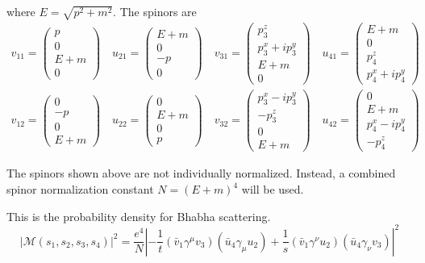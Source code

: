 \documentclass[12pt]{article}
\begin{document}
\noindent
where $E=\sqrt{p^2+m^2}$.
The spinors are
\begin{gather*}
v_{11}=\begin{pmatrix}p\\0\\E+m\\0\end{pmatrix}\quad
u_{21}=\begin{pmatrix}E+m\\0\\-p\\0\end{pmatrix}\quad
v_{31}=\begin{pmatrix}p_3^z\\p_3^x+ip_3^y\\E+m\\0\end{pmatrix}\quad
u_{41}=\begin{pmatrix}E+m\\0\\p_4^z\\p_4^x+ip_4^y\end{pmatrix}
\\
v_{12}=\begin{pmatrix}0\\-p\\0\\E+m\end{pmatrix}\quad
u_{22}=\begin{pmatrix}0\\E+m\\0\\p\end{pmatrix}\quad
v_{32}=\begin{pmatrix}p_3^x-ip_3^y\\-p_3^z\\0\\E+m\end{pmatrix}\quad
u_{42}=\begin{pmatrix}0\\E+m\\p_4^x-ip_4^y\\-p_4^z\end{pmatrix}
\end{gather*}

\noindent
The spinors shown above are not individually normalized.
Instead, a combined spinor normalization constant $N=(E+m)^4$
will be used.

\bigskip
\noindent
This is the probability density for Bhabha scattering.
$$
|\mathcal{M}(s_1,s_2,s_3,s_4)|^2=\frac{e^4}{N}
\left|
-\frac{1}{t}(\bar{v}_1\gamma^\mu v_3)(\bar{u}_4\gamma_\mu u_2)
+\frac{1}{s}(\bar{v}_1\gamma^\nu u_2)(\bar{u}_4\gamma_\nu v_3)
\right|^2
$$
\end{document}

